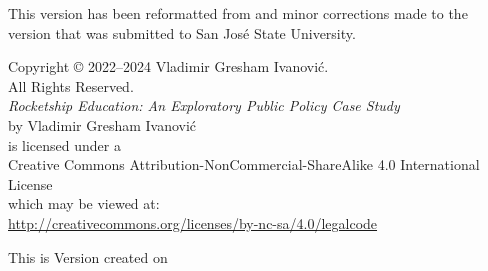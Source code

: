 
\thispagestyle{empty}
\begin{vplace}[1]
  \footnotesize
  \noindent{}This version has been reformatted from and minor corrections made to the version that was submitted to San José State University. 

  \vspace{1in}
  \begin{center}
    Copyright © 2022–2024 Vladimir Gresham Ivanović.\\
    All Rights Reserved.\\\bigskip\bigskip
    \textit{Rocketship Education: An Exploratory Public Policy Case Study}\\
    by Vladimir Gresham Ivanović\\
    is licensed under a \\
    Creative Commons Attribution-NonCommercial-ShareAlike 4.0 International License\\
    which may be viewed at:\\
    \url{http://creativecommons.org/licenses/by-nc-sa/4.0/legalcode}
  \end{center}
\end{vplace}

\vfill
\begin{center}
  \footnotesize This is Version \version{} created on \DTMnow \normalsize
\end{center}
